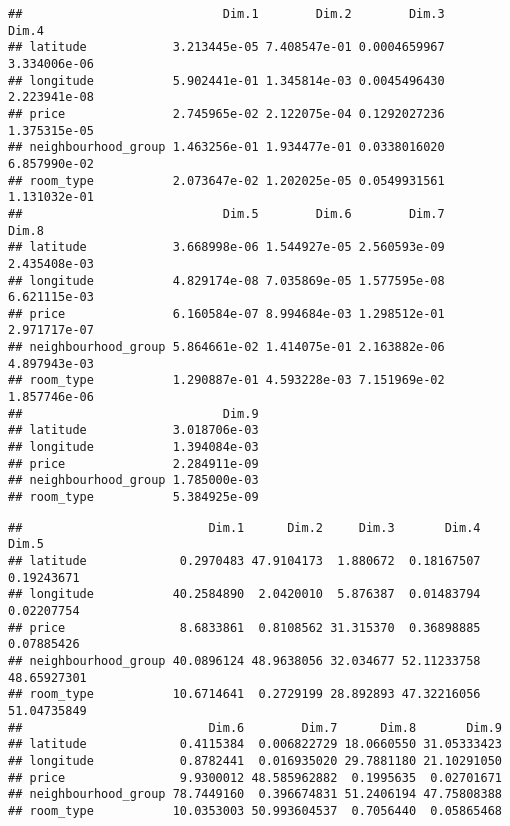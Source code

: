 \documentclass[
]{article}
\newenvironment{Shaded}{\begin{snugshade}}{\end{snugshade}}
\newcommand{\CommentTok}[1]{\textcolor[rgb]{0.56,0.35,0.01}{\textit{#1}}}
\newcommand{\KeywordTok}[1]{\textcolor[rgb]{0.13,0.29,0.53}{\textbf{#1}}}
\newcommand{\NormalTok}[1]{#1}
\newcommand{\OperatorTok}[1]{\textcolor[rgb]{0.81,0.36,0.00}{\textbf{#1}}}
\begin{document}
\begin{Shaded}
\end{Shaded}

\begin{verbatim}
##                            Dim.1        Dim.2        Dim.3        Dim.4
## latitude            3.213445e-05 7.408547e-01 0.0004659967 3.334006e-06
## longitude           5.902441e-01 1.345814e-03 0.0045496430 2.223941e-08
## price               2.745965e-02 2.122075e-04 0.1292027236 1.375315e-05
## neighbourhood_group 1.463256e-01 1.934477e-01 0.0338016020 6.857990e-02
## room_type           2.073647e-02 1.202025e-05 0.0549931561 1.131032e-01
##                            Dim.5        Dim.6        Dim.7        Dim.8
## latitude            3.668998e-06 1.544927e-05 2.560593e-09 2.435408e-03
## longitude           4.829174e-08 7.035869e-05 1.577595e-08 6.621115e-03
## price               6.160584e-07 8.994684e-03 1.298512e-01 2.971717e-07
## neighbourhood_group 5.864661e-02 1.414075e-01 2.163882e-06 4.897943e-03
## room_type           1.290887e-01 4.593228e-03 7.151969e-02 1.857746e-06
##                            Dim.9
## latitude            3.018706e-03
## longitude           1.394084e-03
## price               2.284911e-09
## neighbourhood_group 1.785000e-03
## room_type           5.384925e-09
\end{verbatim}

\begin{Shaded}
\end{Shaded}

\begin{verbatim}
##                          Dim.1      Dim.2     Dim.3       Dim.4       Dim.5
## latitude             0.2970483 47.9104173  1.880672  0.18167507  0.19243671
## longitude           40.2584890  2.0420010  5.876387  0.01483794  0.02207754
## price                8.6833861  0.8108562 31.315370  0.36898885  0.07885426
## neighbourhood_group 40.0896124 48.9638056 32.034677 52.11233758 48.65927301
## room_type           10.6714641  0.2729199 28.892893 47.32216056 51.04735849
##                          Dim.6        Dim.7      Dim.8       Dim.9
## latitude             0.4115384  0.006822729 18.0660550 31.05333423
## longitude            0.8782441  0.016935020 29.7881180 21.10291050
## price                9.9300012 48.585962882  0.1995635  0.02701671
## neighbourhood_group 78.7449160  0.396674831 51.2406194 47.75808388
## room_type           10.0353003 50.993604537  0.7056440  0.05865468
\end{verbatim}
\end{document}
